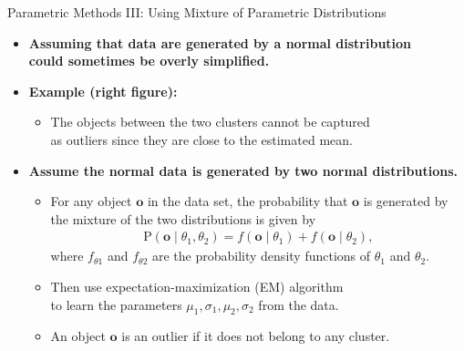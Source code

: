 \begin{frame}{Parametric Methods III: Using Mixture of Parametric Distributions}
	\begin{itemize}
		\item \textbf{Assuming that data are generated by a normal distribution \\ could sometimes be overly simplified.}
		\item \textbf{Example (right figure):}
		      \begin{itemize}
			      \item The objects between the two clusters cannot be captured \\
			            as outliers since they are close to the estimated mean.
		      \end{itemize}
		\item \textbf{Assume the normal data is generated by {\color{airforceblue}two normal distributions.}}
		      \begin{itemize}
			      \item For any object $\mathbf{o}$ in the data set, the probability that $\mathbf{o}$ is generated by the mixture of the two distributions is given by
			            \begin{align}
				            \text{P}(\mathbf{o} \; \vert \; \theta_1, \theta_2) = f(\mathbf{o} \; \vert \; \theta_1) + f(\mathbf{o} \; \vert \; \theta_2),
			            \end{align}
			            where $f_{\theta 1}$ and $f_{\theta 2}$ are the probability density functions of $\theta_1$ and $\theta_2$.
			      \item Then use expectation-maximization (EM) algorithm \\
			            to learn the parameters $\mu_1, \sigma_1, \mu_2, \sigma_2$ from the data.
			      \item An object $\mathbf{o}$ is an outlier if it does not belong to any cluster.
		      \end{itemize}
	\end{itemize}
\end{frame}


